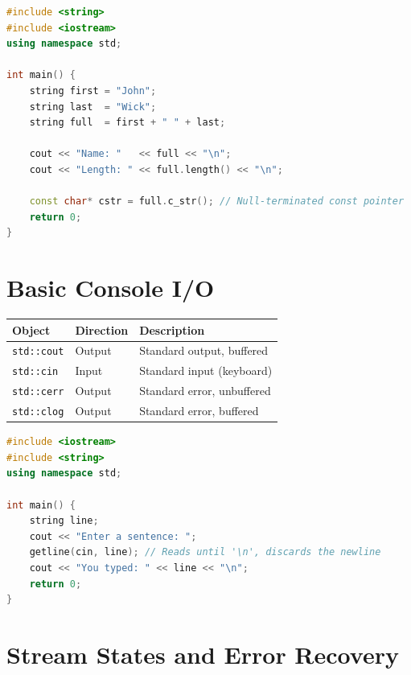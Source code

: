 \begin{lstlisting}[language=C++, caption={std::string replaces C-strings}]
#include <string>
#include <iostream>
using namespace std;

int main() {
    string first = "John";
    string last  = "Wick";
    string full  = first + " " + last;

    cout << "Name: "   << full << "\n";
    cout << "Length: " << full.length() << "\n";

    const char* cstr = full.c_str(); // Null-terminated const pointer
    return 0;
}
\end{lstlisting}

\section{Basic Console I/O}
\label{sec:console-io}

\begin{center}
\begin{tabular}{|l|l|l|}
\hline
\textbf{Object} & \textbf{Direction} & \textbf{Description} \\
\hline
\texttt{std::cout} & Output & Standard output, buffered \\
\texttt{std::cin}  & Input  & Standard input (keyboard) \\
\texttt{std::cerr} & Output & Standard error, unbuffered \\
\texttt{std::clog} & Output & Standard error, buffered \\
\hline
\end{tabular}
\end{center}

\begin{lstlisting}[language=C++, caption={Console I/O and getline}]
#include <iostream>
#include <string>
using namespace std;

int main() {
    string line;
    cout << "Enter a sentence: ";
    getline(cin, line); // Reads until '\n', discards the newline
    cout << "You typed: " << line << "\n";
    return 0;
}
\end{lstlisting}

\section{Stream States and Error Recovery}
\label{sec:stream-states}

